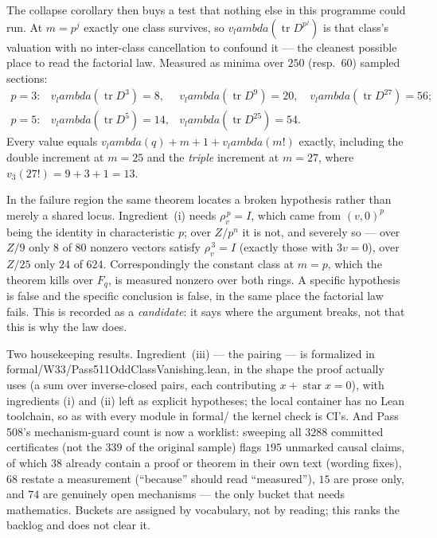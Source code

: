 \documentclass[12pt,a4paper]{article}
\def\mathbb#1{#1}%
\def\texttt#1{#1}%
\def\lambda{lambda}%
\theoremstyle{definition}
\newcommand{\FF}{\mathbb{F}}
\newcommand{\ZZ}{\mathbb{Z}}
\begin{document}
The collapse corollary then buys a test that nothing else in this programme
could run.  At $m=p^{j}$ exactly one class survives, so
$v_\lambda(\operatorname{tr}D^{p^j})$ is that class's valuation with no
inter-class cancellation to confound it --- the cleanest possible place to read
the factorial law.  Measured as minima over $250$ (resp.\ $60$) sampled
sections:
\[
\begin{array}{llll}
p=3: & v_\lambda(\operatorname{tr}D^{3})=8, &
       v_\lambda(\operatorname{tr}D^{9})=20, &
       v_\lambda(\operatorname{tr}D^{27})=56;\\
p=5: & v_\lambda(\operatorname{tr}D^{5})=14, &
       v_\lambda(\operatorname{tr}D^{25})=54. &
\end{array}
\]
Every value equals $v_\lambda(q)+m+1+v_\lambda(m!)$ exactly, including the
double increment at $m=25$ and the \emph{triple} increment at $m=27$, where
$v_3(27!)=9+3+1=13$.

In the failure region the same theorem locates a broken hypothesis rather than
merely a shared locus.  Ingredient~(i) needs $\rho_v^{\,p}=I$, which came from
$(v,0)^p$ being the identity in characteristic $p$; over $\ZZ/p^n$ it is not,
and severely so --- over $\ZZ/9$ only $8$ of $80$ nonzero vectors satisfy
$\rho_v^{\,3}=I$ (exactly those with $3v=0$), over $\ZZ/25$ only $24$ of $624$.
Correspondingly the constant class at $m=p$, which the theorem kills over
$\FF_q$, is measured nonzero over both rings.  A specific hypothesis is false
and the specific conclusion is false, in the same place the factorial law
fails.  This is recorded as a \emph{candidate}: it says where the argument
breaks, not that this is why the law does.

Two housekeeping results.  Ingredient~(iii) --- the pairing --- is formalized
in \texttt{formal/W33/Pass511OddClassVanishing.lean}, in the shape the proof
actually uses (a sum over inverse-closed pairs, each contributing
$x+\operatorname{star}x=0$), with ingredients (i) and (ii) left as explicit
hypotheses; the local container has no Lean toolchain, so as with every module
in \texttt{formal/} the kernel check is CI's.  And Pass 508's mechanism-guard
count is now a worklist: sweeping all $3288$ committed certificates (not the
$339$ of the original sample) flags $195$ unmarked causal claims, of which $38$
already contain a proof or theorem in their own text (wording fixes), $68$
restate a measurement (``because'' should read ``measured''), $15$ are prose
only, and $74$ are genuinely open mechanisms --- the only bucket that needs
mathematics.  Buckets are assigned by vocabulary, not by reading; this ranks
the backlog and does not clear it.
\end{document}
